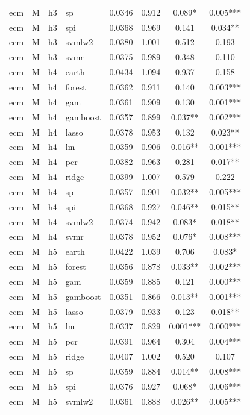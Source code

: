 \begin{ThreePartTable}
\begin{longtable}[t]{llclcccc}
ecm & M & h3 & sp & 0.0346 & 0.912 & 0.089* & 0.005***\\
ecm & M & h3 & spi & 0.0368 & 0.969 & 0.141 & 0.034**\\
ecm & M & h3 & svmlw2 & 0.0380 & 1.001 & 0.512 & 0.193\\
ecm & M & h3 & svmr & 0.0375 & 0.989 & 0.348 & 0.110\\
\addlinespace
ecm & M & h4 & earth & 0.0434 & 1.094 & 0.937 & 0.158\\
ecm & M & h4 & forest & 0.0362 & 0.911 & 0.140 & 0.003***\\
ecm & M & h4 & gam & 0.0361 & 0.909 & 0.130 & 0.001***\\
ecm & M & h4 & gamboost & 0.0357 & 0.899 & 0.037** & 0.002***\\
ecm & M & h4 & lasso & 0.0378 & 0.953 & 0.132 & 0.023**\\
ecm & M & h4 & lm & 0.0359 & 0.906 & 0.016** & 0.001***\\
ecm & M & h4 & pcr & 0.0382 & 0.963 & 0.281 & 0.017**\\
ecm & M & h4 & ridge & 0.0399 & 1.007 & 0.579 & 0.222\\
ecm & M & h4 & sp & 0.0357 & 0.901 & 0.032** & 0.005***\\
ecm & M & h4 & spi & 0.0368 & 0.927 & 0.046** & 0.015**\\
ecm & M & h4 & svmlw2 & 0.0374 & 0.942 & 0.083* & 0.018**\\
ecm & M & h4 & svmr & 0.0378 & 0.952 & 0.076* & 0.008***\\
\addlinespace
ecm & M & h5 & earth & 0.0422 & 1.039 & 0.706 & 0.083*\\
ecm & M & h5 & forest & 0.0356 & 0.878 & 0.033** & 0.002***\\
ecm & M & h5 & gam & 0.0359 & 0.885 & 0.121 & 0.000***\\
ecm & M & h5 & gamboost & 0.0351 & 0.866 & 0.013** & 0.001***\\
ecm & M & h5 & lasso & 0.0379 & 0.933 & 0.123 & 0.018**\\
ecm & M & h5 & lm & 0.0337 & 0.829 & 0.001*** & 0.000***\\
ecm & M & h5 & pcr & 0.0391 & 0.964 & 0.304 & 0.004***\\
ecm & M & h5 & ridge & 0.0407 & 1.002 & 0.520 & 0.107\\
ecm & M & h5 & sp & 0.0359 & 0.884 & 0.014** & 0.008***\\
ecm & M & h5 & spi & 0.0376 & 0.927 & 0.068* & 0.006***\\
ecm & M & h5 & svmlw2 & 0.0361 & 0.888 & 0.026** & 0.005***\\

\end{longtable}
\end{ThreePartTable}
